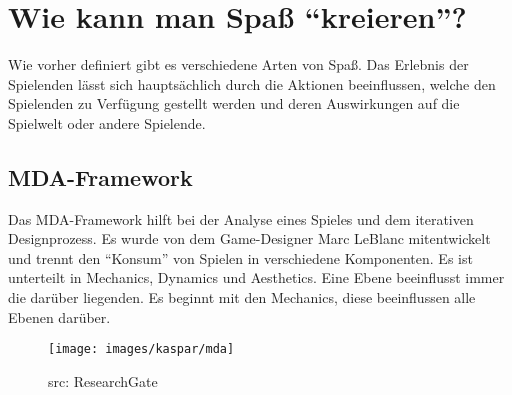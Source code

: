\section{Wie kann man Spaß "`kreieren"'?}

Wie vorher definiert gibt es verschiedene Arten von Spaß. Das Erlebnis der Spielenden lässt sich hauptsächlich durch die Aktionen beeinflussen, welche den Spielenden zu Verfügung gestellt werden und deren Auswirkungen auf die Spielwelt oder andere Spielende.

\subsection{MDA-Framework}

Das MDA-Framework hilft bei der Analyse eines Spieles und dem iterativen Designprozess. Es wurde von dem Game-Designer Marc LeBlanc mitentwickelt und trennt den "`Konsum"' von Spielen in verschiedene Komponenten\cite{_mda}. Es ist unterteilt in Mechanics, Dynamics und Aesthetics. Eine Ebene beeinflusst immer die darüber liegenden. Es beginnt mit den Mechanics, diese beeinflussen alle Ebenen darüber.

\begin{figure}[H]
	\centering
	\texttt{[image: images/kaspar/mda]}
	\caption{src: ResearchGate}
\end{figure}

